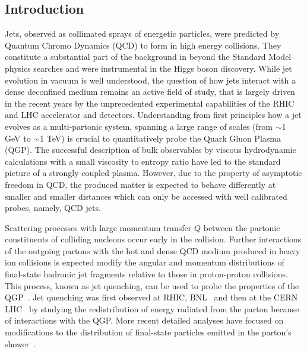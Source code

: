 \subsection{Introduction}
Jets, observed as collimated sprays of energetic particles, were predicted by Quantum Chromo Dynamics (QCD) to form in high energy collisions. They constitute a substantial part of the background in beyond the Standard Model physics searches and were instrumental in the Higgs boson discovery. While jet evolution in vacuum is well understood, the question of how jets interact with a dense deconfined medium remains an active field of study, that is largely driven in the recent years by the unprecedented experimental capabilities of the RHIC and LHC accelerator and detectors.  Understanding from first principles how a jet evolves as a multi-partonic system, spanning a large range of scales (from  $\sim$1 GeV to $\sim$1 TeV) is crucial to quantitatively probe the Quark Gluon Plasma (QGP).  The successful description of bulk observables by viscous hydrodynamic calculations with a small viscosity to entropy ratio have led to the standard picture of a strongly coupled plasma. However, due to the property of asymptotic freedom in QCD, the produced matter is expected to behave differently at smaller and smaller distances which can only be accessed with well calibrated probes, namely, QCD jets.

Scattering processes with large momentum transfer $Q$ between the partonic constituents of colliding nucleons occur early in the collision. Further interactions of the outgoing partons with the hot and dense QCD medium produced in heavy ion collisions is expected modify the angular and momentum distributions of final-state hadronic jet fragments relative to those in proton-proton collisions. This process, known as jet quenching, can be used to probe the properties of the QGP~\cite{Gyulassy:1990ye,Baier:1994bd}. Jet quenching was first observed at RHIC, BNL~\cite{Adcox:2001jp,Adler:2003qi,Adams:2003kv,Arsene:2003yk,Back:2003qr,Adamczyk:2016fqm,Adamczyk:2017yhe} and then at the CERN LHC~\cite{Aamodt:2010jd,Aamodt:2011vg,Aad:2015wga,CMS:2012aa,Aad:2010bu,Chatrchyan:2012nia,Aad:2012vca,Abelev:2013kqa,Adam:2015ewa,Khachatryan:2016odn,Adam:2015doa} by studying the redistribution of energy radiated from the parton because of interactions with the QGP. More recent detailed analyses have focused on modifications to the distribution of final-state particles emitted in the parton's shower~\cite{Chatrchyan:2013kwa,Chatrchyan:2014ava,Aaboud:2017bzv,Acharya:2017goa}.

